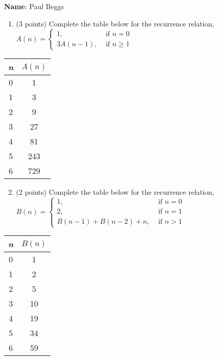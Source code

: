 \documentclass{article}
\begin{document}
\textbf{Name}: Paul Beggs

\begin{enumerate}
    \item (3 points) Complete the table below for the recurrence relation,         $A(n) = \begin{cases}
        1, &\text{ if } n = 0 \\
        3A(n-1), &\text { if } n \geq 1
    \end{cases}$
\end{enumerate}

\vspace{0.3cm}
\begin{center}
    
    \begin{tabular}{c|c}
        \textit{n} & \(A(n)\) \\
        \hline
        0 & 1 \\
        1 & 3 \\
        2 & 9 \\
        3 & 27 \\
        4 & 81 \\
        5 & 243 \\
        6 & 729 \\
    \end{tabular}
\end{center}

\vspace{0.5cm}

\begin{enumerate}
    \setcounter{enumi}{1}
    \item (2 points) Complete the table below for the recurrence relation, \\
    $B(n) = \begin{cases}
        1, &\text{ if } n = 0 \\
        2, &\text { if } n = 1 \\
        B(n-1) + B(n-2) + n, &\text{ if } n > 1
    \end{cases}$
\end{enumerate}

\vspace{0.3cm}


\begin{center}
    
\begin{tabular}{c|c}
\textit{n} & \(B(n)\) \\
\hline
0 & 1 \\
1 & 2 \\
2 & 5 \\
3 & 10 \\
4 & 19 \\
5 & 34 \\
6 & 59 \\
\end{tabular}

\end{center}
\end{document}
